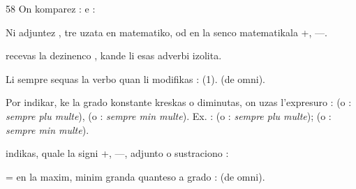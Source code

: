 \begin{VUpage}[62]{58}
{On komparez :  e : \nl
{}%
}

Ni adjuntez , tre uzata en matematiko, od en\nl
la senco matematikala +, ---.

 recevas la dezinenco , kande\nl
li esas adverbi izolita.

Li sempre sequas la verbo quan li modifikas : \nl
{} (1). \nl
{} (de omni).

Por indikar, ke la grado konstante kreskas o diminutas,\nl
on uzas l'expresuro :  (o : \textit{sempre plu multe}),\nl
{} (o : \textit{sempre min multe}). Ex. : \nl
{} (o : \textit{sempre plu multe}); \nl
(o : \textit{sempre min multe}).

 indikas, quale la signi +, ---, adjunto o\nl
sustraciono : \nl
{}

 = en la maxim, minim granda quanteso\nl
a grado :  (de omni).\parplein
\end{VUpage}

